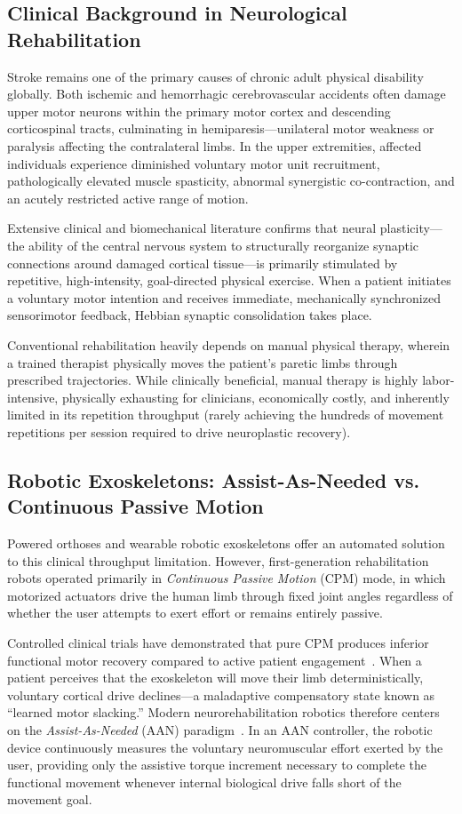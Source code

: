 \documentclass[11pt,a4paper]{article}
\begin{document}
\subsection{Clinical Background in Neurological Rehabilitation}
Stroke remains one of the primary causes of chronic adult physical disability globally. Both ischemic and hemorrhagic cerebrovascular accidents often damage upper motor neurons within the primary motor cortex and descending corticospinal tracts, culminating in hemiparesis---unilateral motor weakness or paralysis affecting the contralateral limbs. In the upper extremities, affected individuals experience diminished voluntary motor unit recruitment, pathologically elevated muscle spasticity, abnormal synergistic co-contraction, and an acutely restricted active range of motion.

Extensive clinical and biomechanical literature confirms that neural plasticity---the ability of the central nervous system to structurally reorganize synaptic connections around damaged cortical tissue---is primarily stimulated by repetitive, high-intensity, goal-directed physical exercise. When a patient initiates a voluntary motor intention and receives immediate, mechanically synchronized sensorimotor feedback, Hebbian synaptic consolidation takes place. 

Conventional rehabilitation heavily depends on manual physical therapy, wherein a trained therapist physically moves the patient's paretic limbs through prescribed trajectories. While clinically beneficial, manual therapy is highly labor-intensive, physically exhausting for clinicians, economically costly, and inherently limited in its repetition throughput (rarely achieving the hundreds of movement repetitions per session required to drive neuroplastic recovery).

\subsection{Robotic Exoskeletons: Assist-As-Needed vs. Continuous Passive Motion}
Powered orthoses and wearable robotic exoskeletons offer an automated solution to this clinical throughput limitation. However, first-generation rehabilitation robots operated primarily in \textit{Continuous Passive Motion} (CPM) mode, in which motorized actuators drive the human limb through fixed joint angles regardless of whether the user attempts to exert effort or remains entirely passive.

Controlled clinical trials have demonstrated that pure CPM produces inferior functional motor recovery compared to active patient engagement~\cite{marchalcrespo2009}. When a patient perceives that the exoskeleton will move their limb deterministically, voluntary cortical drive declines---a maladaptive compensatory state known as ``learned motor slacking.'' Modern neurorehabilitation robotics therefore centers on the \textit{Assist-As-Needed} (AAN) paradigm~\cite{stienen2009, yan2015, young2017}. In an AAN controller, the robotic device continuously measures the voluntary neuromuscular effort exerted by the user, providing only the assistive torque increment necessary to complete the functional movement whenever internal biological drive falls short of the movement goal.
\end{document}
